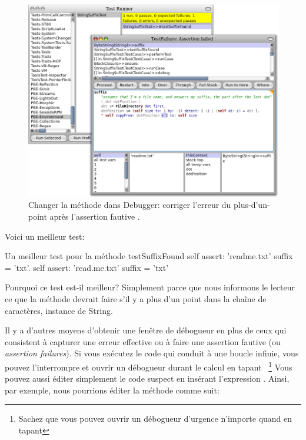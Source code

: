 \documentclass[a4paper,10pt,twoside]{book}
\begin{document}
\begin{figure}[btp]
	\begin{center}
		\includegraphics[width=\textwidth]{fixOffByOne}
	\end{center}
	\caption{Changer la méthode  dans Debugger: corriger l'erreur du plus-d'un-point après l'assertion fautive \sunit.}
\end{figure} %

Voici un meilleur test:

\begin{method}[testSuffix2]{Un meilleur test pour la méthode }
testSuffixFound
	self assert: 'readme.txt' suffix = 'txt'.
	self assert: 'read.me.txt' suffix = 'txt'
\end{method}
\noindent
Pourquoi ce test est-il meilleur? Simplement parce que
nous informons le lecteur ce que la méthode devrait faire 
s'il y a plus d'un point dans la chaîne de caractères, instance de String.

Il y a d'autres moyens d'obtenir une fenêtre de débogueur en plus de ceux
qui consistent à capturer une erreur effective ou à faire une assertion
fautive (ou \emph{assertion failures}).
Si vous exécutez le code qui conduit à une boucle infinie, vous pouvez
l'interrompre et ouvrir un débogueur durant le calcul en tapant %
~\footnote{Sachez que vous pouvez ouvrir un débogueur d'urgence n'importe quand en tapant
}
Vous pouvez aussi éditer simplement le code suspect en insérant l'expression .
Ainsi, par exemple, nous pourrions éditer la méthode  comme suit:
\end{document}
